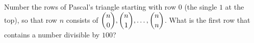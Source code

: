 Number the rows of Pascal's triangle starting with row $0$ (the single $1$ at the top), so that row $n$ consists of $\dbinom n0,\dbinom n1,\dots,\dbinom nn$. What is the first row that contains a number divisible by $100$?
